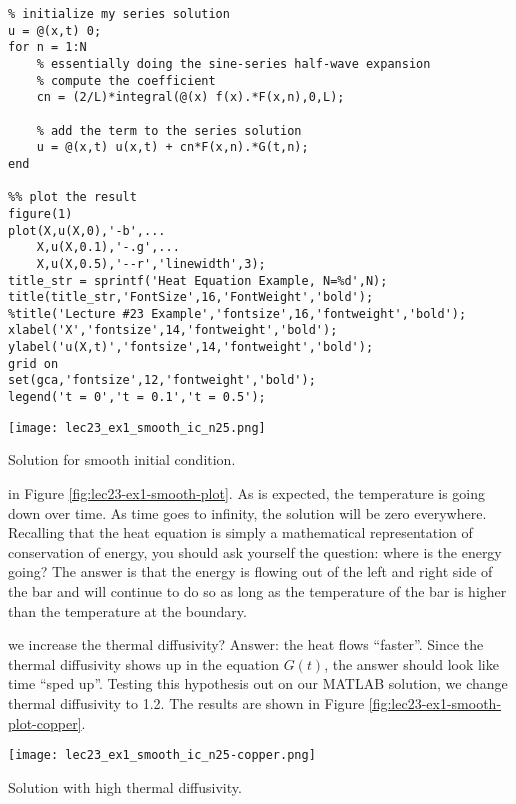 \begin{lstlisting}[name=lec23_ex1, style=myMatlab]
%% Compute the solution
% initialize my series solution
u = @(x,t) 0;
for n = 1:N
    % essentially doing the sine-series half-wave expansion
    % compute the coefficient
    cn = (2/L)*integral(@(x) f(x).*F(x,n),0,L);
    
    % add the term to the series solution
    u = @(x,t) u(x,t) + cn*F(x,n).*G(t,n);
end

%% plot the result
figure(1)
plot(X,u(X,0),'-b',...
    X,u(X,0.1),'-.g',...
    X,u(X,0.5),'--r','linewidth',3);
title_str = sprintf('Heat Equation Example, N=%d',N);
title(title_str,'FontSize',16,'FontWeight','bold');
%title('Lecture #23 Example','fontsize',16,'fontweight','bold');
xlabel('X','fontsize',14,'fontweight','bold');
ylabel('u(X,t)','fontsize',14,'fontweight','bold');
grid on
set(gca,'fontsize',12,'fontweight','bold');
legend('t = 0','t = 0.1','t = 0.5');
\end{lstlisting}
\begin{marginfigure}
\texttt{[image: lec23\_ex1\_smooth\_ic\_n25.png]}
\caption{Solution for smooth initial condition.}
\label{fig:lec23-ex1-smooth-plot}
\end{marginfigure}
 in Figure \ref{fig:lec23-ex1-smooth-plot}. As is expected, the temperature is going down over time. As time goes to infinity, the solution will be zero everywhere.  Recalling that the heat equation is simply a mathematical representation of conservation of energy, you should ask yourself the question: where is the energy going?  The answer is that the energy is flowing out of the left and right side of the bar and will continue to do so as long as the temperature of the bar is higher than the temperature at the boundary.

 we increase the thermal diffusivity?  Answer: the heat flows ``faster''.  Since the thermal diffusivity shows up in the equation $G(t)$, the answer should look like time ``sped up''.  Testing this hypothesis out on our MATLAB solution, we change thermal diffusivity to 1.2.  The results are shown in Figure \ref{fig:lec23-ex1-smooth-plot-copper}.
\begin{marginfigure}
\texttt{[image: lec23\_ex1\_smooth\_ic\_n25-copper.png]}
\caption{Solution with high thermal diffusivity.}
\label{fig:lec23-ex1-smooth-plot-copper}
\end{marginfigure}

